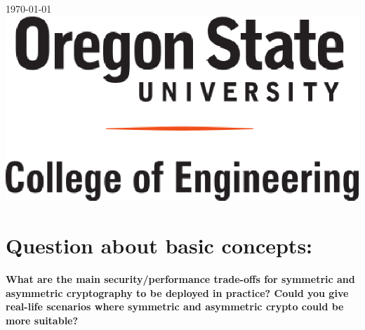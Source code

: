 \documentclass[letterpaper,11pt,notitlepage,fleqn]{article}
\begin{document}
\begin{titlepage}

{\large \today}\\[3cm] %


    \includegraphics[scale=0.5]{coe.eps}\\[1cm] %


\vfill %



\end{titlepage}

\tableofcontents
\newpage

\section{Question about basic concepts:}
\noindent \textbf{What are the main security/performance trade-offs for symmetric and asymmetric cryptography to be deployed in practice? Could you give real-life scenarios where symmetric and asymmetric crypto could be more suitable?}
\end{document}
